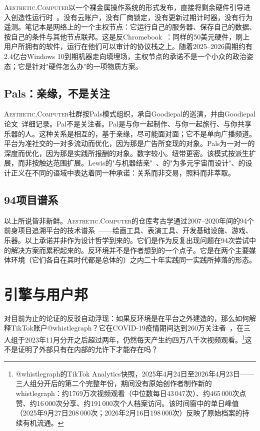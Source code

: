 \documentclass[10pt,letterpaper,twocolumn]{article}
\newcommand{\ac}{\textsc{Aesthetic.Computer}}
\begin{document}
\ac{}以一个裸金属操作系统的形式发布，直接将剩余硬件引导进入创造性运行时~\citep{scudder2026os, scudder2026identity}。没有云账户，没有厂商锁定，没有更新过期计时器，没有行为遥测。笔记本是网络上的一个主权节点：它运行自己的服务器、保存自己的数据、按自己的条件与其他节点联邦。这是反Chromebook~\citep{scudder2026openschools}：同样的50美元硬件，刷上用户所拥有的软件，运行在他们可以审计的协议栈之上。随着2025--2026周期约有2.4亿台Windows 10到期机器走向填埋场，主权节点的承诺不是一个小众的政治姿态；它是针对"硬件怎么办"的一项物质方案。

\subsection{Pals：亲缘，不是关注}

\ac{}社群按Pals模式组织，承自Goodiepal的巡演，并由Goodiepal论文~\citep{scudder2026goodiepal}详细记录。Pal不是关注者。Pal是与你一起制作、与你一起旅行、与你共享乐器的人。这种关系是相互的，基于亲缘，尽可能面对面；它不是单向广播频道。平台为准社交的一对多流动而优化，因为那是广告所变现的对象。Pals为一对一的深度而优化，因为那是实践所报酬的对象。数字较小。纽带更密。该模式按派生扩展，而非按触达范围扩展。Lewis的"与机器结亲"~\citep{lewis2018making}、\citet{escobar2018designs}的"为多元宇宙而设计"、\citet{costanzachock2020design}的设计正义在不同的语域中表达着同一种承诺：关系而非交易，照料而非萃取。

\subsection{94项目谱系}

以上所说皆非新鲜。\ac{}的仓库考古学通过2007--2020年间的94个前身项目追溯平台的技术谱系~\citep{scudder2026archaeology}——绘画工具、表演工具、开发基础设施、游戏、乐器。以上承诺并非作为设计哲学到来的。它们是作为反复出现问题在94次尝试中的解决方案而累积起来的。反环境并不是作者想到的一个点子。它是在两个主要媒体环境（它们各自在其时代都是总体的）之内二十年实践同一实践所掉落的形态。

\section{引擎与用户邦}

对目前为止的论证的反驳自动浮现：如果反环境是在平台之外建造的，那么如何解释TikTok账户@whistlegraph？它在COVID-19疫情期间达到260万关注者~\citep{scudder2026whistlegraph}，在三人组于2023年11月分开之后超过两年，仍然每天产生约四万八千次视频观看。\footnote{@whistlegraph的TikTok Analytics快照，2025年4月24日至2026年4月23日——三人组分开后的第二个完整年份，期间没有原始创作者制作新的whistlegraph：约1769万次视频观看（中位数每日43\,047次）、约465\,000次点赞、约16\,000次分享、约191\,000次个人档案访问。该时间窗中的单日峰值（2025年9月27日208\,000次；2026年2月16日198\,000次）反映了原始档案的持续有机流通。}这不是证明了外部只有在内部的允许下才能存在吗？
\end{document}
